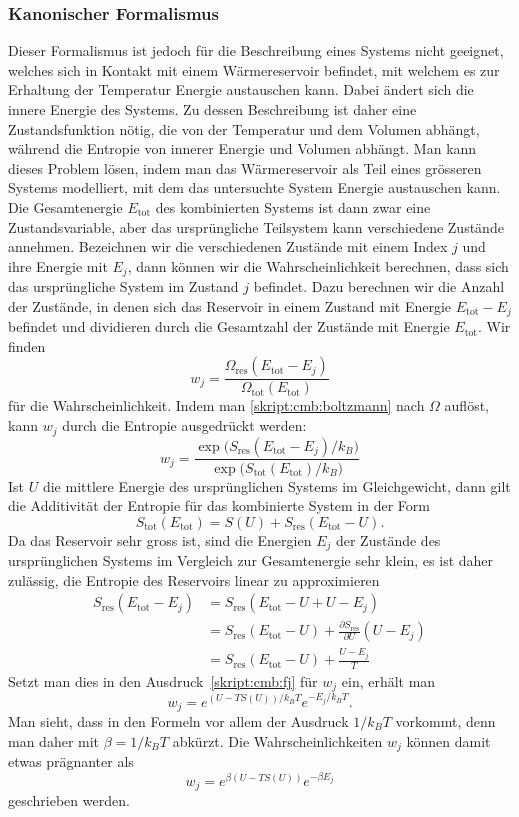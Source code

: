 \subsubsection{Kanonischer Formalismus}
Dieser Formalismus ist jedoch für die Beschreibung eines Systems 
nicht geeignet, welches sich in Kontakt mit einem Wärmereservoir
befindet, mit welchem es zur Erhaltung der Temperatur Energie
austauschen kann.
Dabei ändert sich die innere Energie des Systems.
Zu dessen Beschreibung ist daher eine Zustandsfunktion nötig, die von
der Temperatur und dem Volumen abhängt, während die Entropie
von innerer Energie und Volumen abhängt.
Man kann dieses Problem lösen, indem man das Wärmereservoir als
Teil eines grösseren Systems modelliert, mit dem das untersuchte
System Energie austauschen kann.
Die Gesamtenergie $E_\text{tot}$ des kombinierten Systems ist dann zwar eine
Zustandsvariable, aber das ursprüngliche Teilsystem kann verschiedene
Zustände annehmen.
Bezeichnen wir die verschiedenen Zustände mit einem Index $j$
und ihre Energie mit $E_j$, dann können wir die Wahrscheinlichkeit
berechnen, dass sich das ursprüngliche System im Zustand $j$ befindet.
Dazu berechnen wir die Anzahl der Zustände, in denen sich das 
Reservoir in einem Zustand mit Energie $E_\text{tot} - E_j$ befindet
und dividieren durch die Gesamtzahl der Zustände mit Energie $E_\text{tot}$.
Wir finden
\[
w_j
=
\frac{\Omega_\text{res}(E_\text{tot}-E_j)}{\Omega_\text{tot}(E_\text{tot})}
\]
für die Wahrscheinlichkeit.
Indem man \eqref{skript:cmb:boltzmann} nach $\Omega$ auflöst, kann $w_j$
durch die Entropie ausgedrückt werden:
\begin{equation}
w_j
=
\frac{\exp\bigl(S_\text{res}(E_\text{tot}-E_j)/k_B\bigr)}{\exp\bigl(S_\text{tot}(E_\text{tot})/k_B\bigr)}
\label{skript:cmb:fj}
\end{equation}
Ist $U$ die mittlere Energie des ursprünglichen Systems im Gleichgewicht,
dann gilt die Additivität der Entropie für das kombinierte System in der Form
\[
S_\text{tot}(E_\text{tot})
=
S(U) + S_\text{res}(E_\text{tot}-U).
\]
Da das Reservoir sehr gross ist, sind die Energien $E_j$ der Zustände des
ursprünglichen Systems im Vergleich zur Gesamtenergie sehr klein,
es ist daher zulässig, die Entropie des Reservoirs linear zu approximieren
\begin{align*}
S_\text{res}(E_\text{tot}-E_j)
&=
S_\text{res}(E_\text{tot}-U+U-E_j)
\\
&=
S_\text{res}(E_\text{tot}-U) + \frac{\partial S_\text{res}}{\partial U}(U-E_j)
\\
&=
S_\text{res}(E_\text{tot}-U) + \frac{U-E_j}{T}
\end{align*}
Setzt man dies in den Ausdruck~\eqref{skript:cmb:fj} für $w_j$ ein, 
erhält man
\[
w_j = e^{(U-TS(U))/k_BT} e^{-E_j/k_BT}.
\]
Man sieht, dass in den Formeln vor allem der Ausdruck $1/k_BT$ vorkommt,
denn man daher mit $\beta=1/k_BT$ abkürzt.
Die Wahrscheinlichkeiten $w_j$ können damit etwas prägnanter als
\begin{equation}
w_j = e^{\beta(U-TS(U))}e^{-\beta E_j}
\label{skript:cmb:fj2}
\end{equation}
geschrieben werden.

